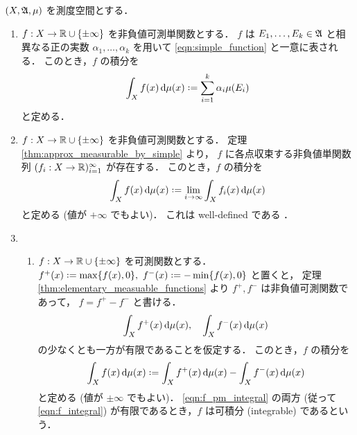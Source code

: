 \begin{definition}
    $(X,\mathfrak{A},\mu)$ を測度空間とする．
    \begin{enumerate}
        \item $f:X\to\mathbb{R}\cup\{\pm\infty\}$ を非負値可測単関数とする．
            $f$ は $E_1,\ldots,E_k\in\mathfrak{A}$ と相異なる正の実数 $\alpha_1,\ldots,\alpha_k$ を用いて
            \eqref{eqn:simple_function} と一意に表される．
            このとき，$f$ の積分を
            \begin{align*}
                \int_Xf(x)\,\drm\mu(x)\defeq\sum_{i=1}^k\alpha_i\mu(E_i)
            \end{align*}
            と定める．
        \item $f:X\to\mathbb{R}\cup\{\pm\infty\}$ を非負値可測関数とする．
            定理 \ref{thm:approx_measurable_by_simple} より，
            $f$ に各点収束する非負値単関数列 $(f_i:X\to\mathbb{R})_{i=1}^\infty$ が存在する．
            このとき，$f$ の積分を
            \begin{align*}
                \int_Xf(x)\,\drm\mu(x)\defeq\lim_{i\to\infty}\int_Xf_i(x)\,\drm\mu(x)
            \end{align*}
            と定める (値が $+\infty$ でもよい)．
            これは well-defined である \cite[pp.74--77]{It63}．
        \item
            \begin{enumerate}
                \item
                    $f:X\to\mathbb{R}\cup\{\pm\infty\}$ を可測関数とする．
                    $f^+(x)\defeq\max\{f(x),0\},\ f^-(x)\defeq-\min\{f(x),0\}$ と置くと，
                    定理 \ref{thm:elementary_measuable_functions} より $f^+,f^-$ は非負値可測関数であって，
                    $f=f^+-f^-$ と書ける．
                    \begin{align}
                        \int_Xf^+(x)\,\mathrm{d}\mu(x),\quad
                        \int_Xf^-(x)\,\mathrm{d}\mu(x)
                        \label{eqn:f_pm_integral}
                    \end{align}
                    の少なくとも一方が有限であることを仮定する．
                    このとき，$f$ の積分を
                    \begin{align}
                        \int_Xf(x)\,\drm\mu(x)\defeq\int_Xf^+(x)\,\drm\mu(x)-\int_Xf^-(x)\,\drm\mu(x)
                        \label{eqn:f_integral}
                    \end{align}
                    と定める (値が $\pm\infty$ でもよい)．
                    \eqref{eqn:f_pm_integral} の両方 (従って \eqref{eqn:f_integral}) が有限であるとき，$f$ は可積分 (integrable) であるという．

\end{enumerate}
\end{enumerate}
\end{definition}
